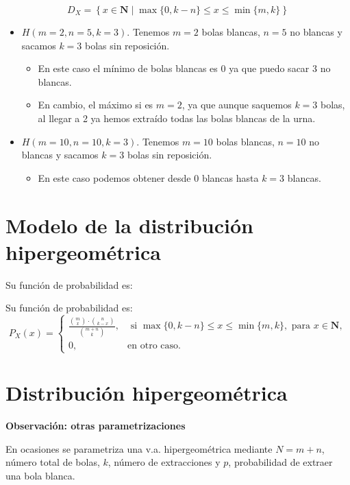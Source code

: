 \documentclass[
  letterpaper,
  DIV=11,
  numbers=noendperiod]{scrreprt}
\providecommand{\tightlist}{%
  \setlength{\itemsep}{0pt}\setlength{\parskip}{0pt}}\usepackage{longtable,booktabs,array}
\begin{document}
\[D_X=\left\{x\in\mathbf{N}\mid \max\{0,k-n\}\leq  x \leq \min\{m,k\}\right\}\]

\begin{itemize}
\tightlist
\item
  \(H(m=2,n=5,k=3)\). Tenemos \(m=2\) bolas blancas, \(n=5\) no blancas
  y sacamos \(k=3\) bolas sin reposición.

  \begin{itemize}
  \tightlist
  \item
    En este caso el mínimo de bolas blancas es \(0\) ya que puedo sacar
    3 no blancas.
  \item
    En cambio, el máximo si es \(m=2\), ya que aunque saquemos \(k=3\)
    bolas, al llegar a 2 ya hemos extraído todas las bolas blancas de la
    urna.
  \end{itemize}
\item
  \(H(m=10,n=10,k=3)\). Tenemos \(m=10\) bolas blancas, \(n=10\) no
  blancas y sacamos \(k=3\) bolas sin reposición.

  \begin{itemize}
  \tightlist
  \item
    En este caso podemos obtener desde \(0\) blancas hasta \(k=3\)
    blancas.
  \end{itemize}
\end{itemize}

\section{Modelo de la distribución
hipergeométrica}\label{modelo-de-la-distribuciuxf3n-hipergeomuxe9trica-5}

Su función de probabilidad es:

Su función de probabilidad es: \[
P_{X}(x)=\left\{
\begin{array}{ll}
\frac{\binom{m}{x}\cdot \binom{n}{k-x}}{\binom{m+n}{k}}, & \mbox{ si }
\max\{0,k-n\}\leq x \leq \min\{m,k\}, \mbox { para  } x\in \mathbf{N},\\
0,  & \mbox{en otro caso.}\end{array}\right.
\]

\section{Distribución
hipergeométrica}\label{distribuciuxf3n-hipergeomuxe9trica-1}

\textbf{Observación: otras parametrizaciones}

En ocasiones se parametriza una v.a. hipergeométrica mediante \(N=m+n\),
número total de bolas, \(k\), número de extracciones y \(p\),
probabilidad de extraer una bola blanca.
\end{document}
